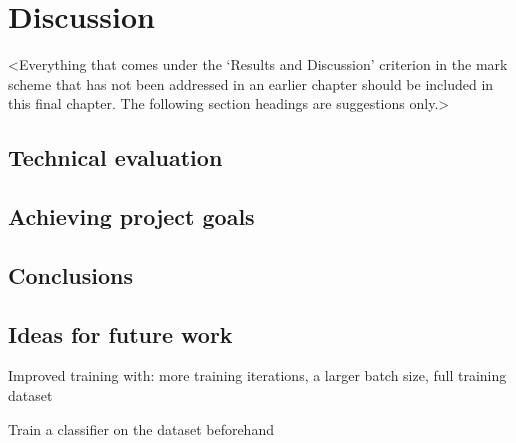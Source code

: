 \chapter{Discussion}
\label{chapter4}

<Everything that comes under the `Results and Discussion' criterion in the mark scheme that has not been addressed in an earlier chapter should be included in this final chapter. The following section headings are suggestions only.>

\section{Technical evaluation}

\section{Achieving project goals}

\section{Conclusions}

\section{Ideas for future work}
Improved training with: more training iterations, a larger batch size, full training dataset

Train a classifier on the dataset beforehand
